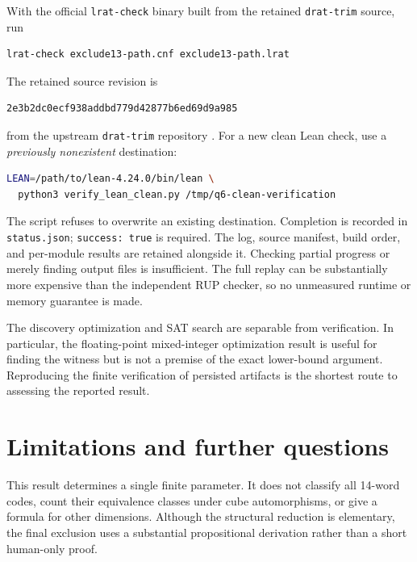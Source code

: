 \documentclass[11pt]{article}
\begin{document}
With the official \texttt{lrat-check} binary built from the retained \texttt{drat-trim} source, run
\begin{lstlisting}[language=bash]
lrat-check exclude13-path.cnf exclude13-path.lrat
\end{lstlisting}
The retained source revision is
\begin{lstlisting}
2e3b2dc0ecf938addbd779d42877b6ed69d9a985
\end{lstlisting}
from the upstream \texttt{drat-trim} repository \cite{drattrim}. For a new clean Lean check, use a \emph{previously nonexistent} destination:
\begin{lstlisting}[language=bash]
LEAN=/path/to/lean-4.24.0/bin/lean \
  python3 verify_lean_clean.py /tmp/q6-clean-verification
\end{lstlisting}
The script refuses to overwrite an existing destination. Completion is recorded in \texttt{status.json}; \texttt{success: true} is required. The log, source manifest, build order, and per-module results are retained alongside it. Checking partial progress or merely finding output files is insufficient. The full replay can be substantially more expensive than the independent RUP checker, so no unmeasured runtime or memory guarantee is made.

The discovery optimization and SAT search are separable from verification. In particular, the floating-point mixed-integer optimization result is useful for finding the witness but is not a premise of the exact lower-bound argument. Reproducing the finite verification of persisted artifacts is the shortest route to assessing the reported result.

\section{Limitations and further questions}
This result determines a single finite parameter. It does not classify all 14-word codes, count their equivalence classes under cube automorphisms, or give a formula for other dimensions. Although the structural reduction is elementary, the final exclusion uses a substantial propositional derivation rather than a short human-only proof.

\clearpage
\appendix
\end{document}

